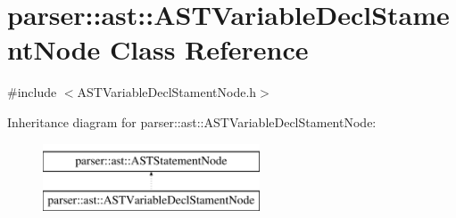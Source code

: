 \hypertarget{classparser_1_1ast_1_1ASTVariableDeclStamentNode}{}\section{parser\+:\+:ast\+:\+:A\+S\+T\+Variable\+Decl\+Stament\+Node Class Reference}
\label{classparser_1_1ast_1_1ASTVariableDeclStamentNode}


{\ttfamily \#include $<$A\+S\+T\+Variable\+Decl\+Stament\+Node.\+h$>$}

Inheritance diagram for parser\+:\+:ast\+:\+:A\+S\+T\+Variable\+Decl\+Stament\+Node\+:\begin{figure}[H]
\begin{center}
\leavevmode
\includegraphics[height=2.000000cm]{d8/dc3/classparser_1_1ast_1_1ASTVariableDeclStamentNode}
\end{center}
\end{figure}
